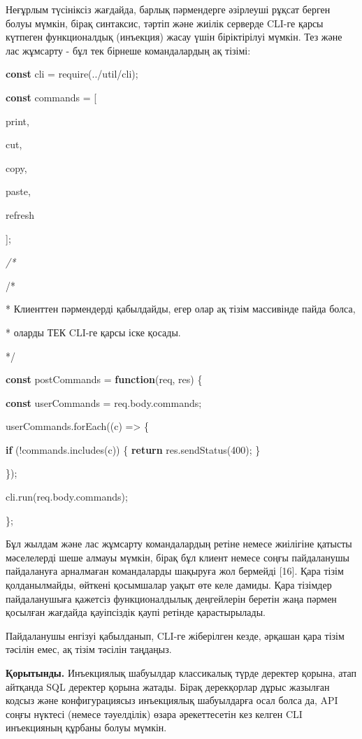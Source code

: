 Неғұрлым түсініксіз жағдайда, барлық пәрмендерге әзірлеуші рұқсат берген
болуы мүмкін, бірақ синтаксис, тәртіп және жиілік серверде CLI-ге қарсы
күтпеген функционалдық (инъекция) жасау үшін біріктірілуі мүмкін. Тез
және лас жұмсарту - бұл тек бірнеше командалардың ақ тізімі:

{\bfseries const} cli =
require(\textquotesingle../util/cli\textquotesingle);

{\bfseries const} commands = {[}

\textquotesingle print\textquotesingle,

\textquotesingle cut\textquotesingle,

\textquotesingle copy\textquotesingle,

\textquotesingle paste\textquotesingle,

\textquotesingle refresh\textquotesingle{}

{]};

\emph{/*}

/*

* Клиенттен пәрмендерді қабылдайды, егер олар ақ тізім массивінде пайда
болса,

* оларды ТЕК CLI-ге қарсы іске қосады.

*/

{\bfseries const} postCommands = {\bfseries function}(req, res) \{

{\bfseries const} userCommands = req.body.commands;

userCommands.forEach((c) =\textgreater{} \{

{\bfseries if} (!commands.includes(c)) \{ {\bfseries return}
res.sendStatus(400); \}

\});

cli.run(req.body.commands);

\};

Бұл жылдам және лас жұмсарту командалардың ретіне немесе жиілігіне
қатысты мәселелерді шеше алмауы мүмкін, бірақ бұл клиент немесе соңғы
пайдаланушы пайдалануға арналмаған командаларды шақыруға жол бермейді
{[}16{]}. Қара тізім қолданылмайды, өйткені қосымшалар уақыт өте келе
дамиды. Қара тізімдер пайдаланушыға қажетсіз функционалдылық деңгейлерін
беретін жаңа пәрмен қосылған жағдайда қауіпсіздік қаупі ретінде
қарастырылады.

Пайдаланушы енгізуі қабылданып, CLI-ге жіберілген кезде, әрқашан қара
тізім тәсілін емес, ақ тізім тәсілін таңдаңыз.

{\bfseries Қорытынды.} Инъекциялық шабуылдар классикалық түрде деректер
қорына, атап айтқанда SQL деректер қорына жатады. Бірақ дерекқорлар
дұрыс жазылған кодсыз және конфигурациясыз инъекциялық шабуылдарға осал
болса да, API соңғы нүктесі (немесе тәуелділік) өзара әрекеттесетін кез
келген CLI инъекцияның құрбаны болуы мүмкін.

